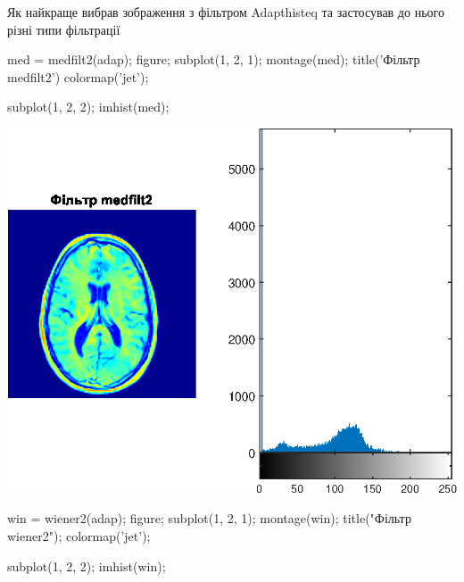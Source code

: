 \documentclass[12pt]{article}
\begin{document}
\begin{par}
\begin{flushleft}
Як найкраще вибрав зображення з фільтром Adapthisteq
та застосував до нього різні типи фільтрації
\end{flushleft}
\end{par}

\begin{matlabcode}
med = medfilt2(adap);
figure;
subplot(1, 2, 1);
montage(med);
title('Фільтр medfilt2')
colormap('jet');

subplot(1, 2, 2);
imhist(med);
\end{matlabcode}
\begin{center}
\includegraphics[width=\maxwidth{56.196688409433015em}]{figure_1}
\end{center}
\begin{matlabcode}

win = wiener2(adap);
figure;
subplot(1, 2, 1);
montage(win);
title("Фільтр  wiener2");
colormap('jet');

subplot(1, 2, 2);
imhist(win);
\end{matlabcode}
\end{document}
